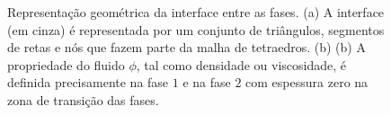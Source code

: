 \documentclass[a4paper,portuges,12pt]{article}
\begin{document}
\begin{figure}[ht!]
	\caption{Representação geométrica da interface entre as fases. (a) A
	interface (em cinza) é representada por um conjunto de triângulos,
	segmentos de retas e nós que fazem parte da malha de tetraedros. (b)
	(b) A propriedade do fluido $\phi$, tal como densidade ou
	viscosidade, é definida precisamente na fase $1$ e na fase $2$ com 
	espessura zero na zona de transição das fases.}
	\label{fig:inter} 
\end{figure}
\end{document}
